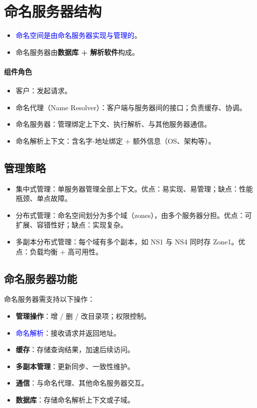 \documentclass[UTF8,a4paper,11pt]{ctexart}
\newcommand{\blue}[1]{\textcolor{blue}{#1}}
\begin{document}
\section{命名服务器结构}

\begin{itemize}
  \item \blue{命名空间是由命名服务器实现与管理的}。
  \item 命名服务器由\textbf{数据库 + 解析软件}构成。
\end{itemize}

\paragraph{组件角色}
\begin{itemize}
  \item 客户：发起请求。
  \item 命名代理（Name Resolver）：客户端与服务器间的接口；负责缓存、协调。
  \item 命名服务器：管理绑定上下文、执行解析、与其他服务器通信。
  \item 命名解析上下文：含名字-地址绑定 + 额外信息（OS、架构等）。
\end{itemize}

\subsection{管理策略}

\begin{itemize}
  \item 集中式管理：单服务器管理全部上下文。优点：易实现、易管理；缺点：性能瓶颈、单点故障。
  \item 分布式管理：命名空间划分为多个域（zones），由多个服务器分担。优点：可扩展、容错性好；缺点：实现复杂。
  \item 多副本分布式管理：每个域有多个副本，如 NS1 与 NS4 同时存 Zone1。优点：负载均衡 + 高可用性。
\end{itemize}

\subsection{命名服务器功能}

命名服务器需支持以下操作：
\begin{itemize}
  \item \textbf{管理操作}：增 / 删 / 改目录项；权限控制。
  \item \blue{命名解析}：接收请求并返回地址。
  \item \textbf{缓存}：存储查询结果，加速后续访问。
  \item \textbf{多副本管理}：更新同步、一致性维护。
  \item \textbf{通信}：与命名代理、其他命名服务器交互。
  \item \textbf{数据库}：存储命名解析上下文或子域。
\end{itemize}
\end{document}
